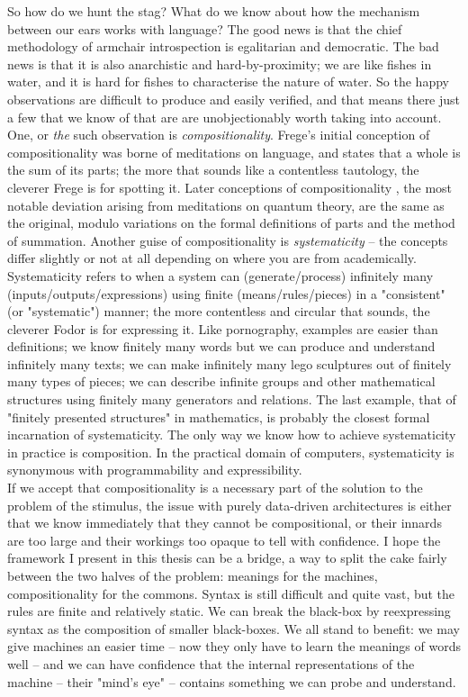 So how do we hunt the stag? What do we know about how the mechanism between our ears works with language? The good news is that the chief methodology of armchair introspection is egalitarian and democratic. The bad news is that it is also anarchistic and hard-by-proximity; we are like fishes in water, and it is hard for fishes to characterise the nature of water. So the happy observations are difficult to produce and easily verified, and that means there just a few that we know of that are are unobjectionably worth taking into account. One, or \emph{the} such observation is \emph{compositionality}. Frege's initial conception of compositionality \citep{} was borne of meditations on language, and states that a whole is the sum of its parts; the more that sounds like a contentless tautology, the cleverer Frege is for spotting it. Later conceptions of compositionality \citep{}, the most notable deviation arising from meditations on quantum theory, are the same as the original, modulo variations on the formal definitions of parts and the method of summation. Another guise of compositionality is \emph{systematicity} -- the concepts differ slightly or not at all depending on where you are from academically. Systematicity \citep{} refers to when a system can (generate/process) infinitely many (inputs/outputs/expressions) using finite (means/rules/pieces) in a "consistent" (or "systematic") manner; the more contentless and circular that sounds, the cleverer Fodor is for expressing it. Like pornography, examples are easier than definitions; we know finitely many words but we can produce and understand infinitely many texts; we can make infinitely many lego sculptures out of finitely many types of pieces; we can describe infinite groups and other mathematical structures using finitely many generators and relations. The last example, that of "finitely presented structures" in mathematics, is probably the closest formal incarnation of systematicity. The only way we know how to achieve systematicity in practice is composition. In the practical domain of computers, systematicity is synonymous with programmability and expressibility.\\

If we accept that compositionality is a necessary part of the solution to the problem of the stimulus, the issue with purely data-driven architectures is either that we know immediately that they cannot be compositional, or their innards are too large and their workings too opaque to tell with confidence. I hope the framework I present in this thesis can be a bridge, a way to split the cake fairly between the two halves of the problem: meanings for the machines, compositionality for the commons. Syntax is still difficult and quite vast, but the rules are finite and relatively static. We can break the black-box by reexpressing syntax as the composition of smaller black-boxes. We all stand to benefit: we may give machines an easier time -- now they only have to learn the meanings of words well -- and we can have confidence that the internal representations of the machine -- their "mind's eye" -- contains something we can probe and understand.


